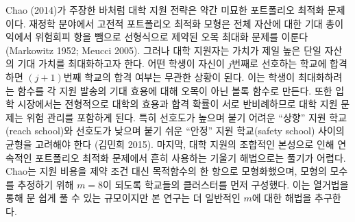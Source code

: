 \documentclass[11pt]{article} %
\newif\ifen
\theoremstyle{definition}
\theoremstyle{definition}
\begin{document}
\ifen
As Chao (2014) remarked, college application represents a somewhat subtle portfolio optimization problem. In computational finance, traditional portfolio optimization models weigh the sum of expected profit across all assets against a risk term, yielding a concave maximization problem with linear constraints (Markowitz 1952; Meucci 2005). But college applicants maximize the expected value of their \emph{best} asset: If a student is admitted to her $j$th choice, then she is indifferent as to whether she gets into her $(j+1)$th choice. As a result, the valuation function that students maximize is \emph{convex} in the expected utility associated with individual applications. Risk management is implicit in the college application problem because, in a typical admissions market, college preferability is negatively correlated with competitiveness. That is, students negotiate a tradeoff between attractive, selective “reach schools” and less preferable “safety schools” where admission is a safer bet (Kim 2015). Finally, the combinatorial nature of the college application problem makes it difficult to solve using the gradient-based techniques used in continuous portfolio optimization. Chao estimated her model (which considers application as a \emph{cost} rather than a constraint) by clustering the schools so that $m=8$, a scale at which enumeration is tractable. Our study pursues a more general solution.
\else
Chao (2014)가 주장한 바처럼 대학 지원 전략은 약간 미묘한 포트폴리오 최적화 문제이다. 재정학 분야에서 고전적 포트폴리오 최적화 모형은 전체 자산에 대한 기대 총이익에서 위험회피 항을 뺌으로 선형식으로 제약된 오목 최대화 문제를 이룬다 (Markowitz 1952; Meucci 2005). 그러나 대학 지원자는 가치가 제일 높은 단일 자산의 기대 가치를 최대화하고자 한다. 어떤 학생이 자신이 $j$번째로 선호하는 학교에 합격하면 $(j+1)$번째 학교의 합격 여부는 무관한 상황이 된다. 이는 학생이 최대화하려는 함수를 각 지원 발송의 기대 효용에 대해 오목이 아닌 볼록 함수로 만든다. 또한 입학 시장에서는 전형적으로 대학의 효용과 합격 확률이 서로 반비례하므로 대학 지원 문제는 위험 관리를 포함하게 된다. 특히 선호도가 높으며 붙기 어려운 “상향” 지원 학교(reach school)와 선호도가 낮으며 붙기 쉬운 “안정” 지원 학교(safety school) 사이의 균형을 고려해야 한다 (김민희 2015). 마지막, 대학 지원의 조합적인 본성으로 인해 연속적인 포트폴리오 최적화 문제에서 흔히 사용하는 기울기 해법으로는 풀기가 어렵다. Chao는 지원 비용을 제약 조건 대신 목적함수의 한 항으로 모형화했으며, 모형의 모수를 추정하기 위해 $m=8$이 되도록 학교들의 클러스터를 먼저 구성했다. 이는 열거법을 통해 문 쉽게 풀 수 있는 규모이지만 본 연구는 더 일반적인 $m$에 대한 해법을 추구한다.
\fi
\end{document}
